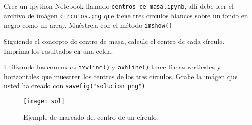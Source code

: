 \documentclass[11pt,letterpaper]{exam}
\begin{document}
\begin{questions}


Cree un Ipython Notebook llamado \verb"centros_de_masa.ipynb", allí
debe leer el archivo de imágen \verb"circulos.png" que tiene tres círculos blancos 
sobre un fondo en negro como un array. Muéstrela con el método
\verb"imshow()"

Siguiendo el concepto de centro de masa, calcule el centro de cada círculo.
Imprima los resultados en una celda.



Utilizando los comandos \verb"axvline()" y \verb"axhline()" trace líneas verticales
y horizontales que muestren los centros de los tres círculos. 
Grabe la imágen que usted ha creado con \texttt{savefig("solucion.png")}

\begin{figure}[hb]
\begin{centering}
\texttt{[image: sol]}
\caption{Ejemplo de marcado del centro de un círculo.}
\end{centering}
\end{figure}
\end{questions}
\end{document}
